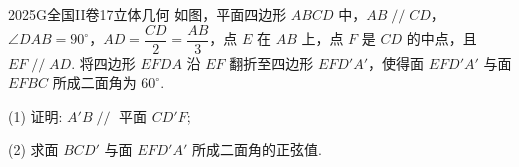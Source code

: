 
\begin{problem}{2025}{G}{全国II卷}{17}{立体几何}
如图，平面四边形 $ABCD$ 中，$AB \mathop{//} CD$，$\angle DAB = 90^\circ$，$AD=\dfrac{CD}{2}=\dfrac{AB}{3}$，点 $E$ 在 $AB$ 上，点 $F$ 是 $CD$ 的中点，且 $EF \mathop{//} AD$. 将四边形 $EFDA$ 沿 $EF$ 翻折至四边形 $EFD'A'$，使得面 $EFD'A'$ 与面 $EFBC$ 所成二面角为 $60^\circ$.

(1) 证明: $A'B \mathop{//}$ 平面 $CD'F$;

(2) 求面 $BCD'$ 与面 $EFD'A'$ 所成二面角的正弦值.
\end{problem}